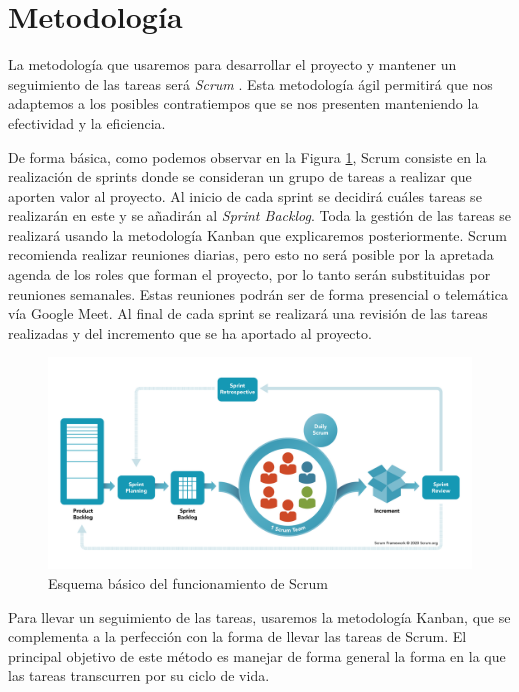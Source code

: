 \section{Metodología}
La metodología que usaremos para desarrollar el proyecto y mantener un seguimiento de las tareas será \textit{Scrum} \cite {scrum}. Esta metodología ágil permitirá que nos adaptemos a los posibles contratiempos que se nos presenten manteniendo la efectividad y la eficiencia. 

De forma básica, como podemos observar en la Figura \ref {fig:scrum_esquema}, Scrum consiste en la realización de sprints donde se consideran un grupo de tareas a realizar que aporten valor al proyecto. Al inicio de cada sprint se decidirá cuáles tareas se realizarán en este y se añadirán al \emph{Sprint Backlog}. Toda la gestión de las tareas se realizará usando la metodología Kanban que explicaremos posteriormente. Scrum recomienda realizar reuniones diarias, pero esto no será posible por la apretada agenda de los roles que forman el proyecto, por lo tanto serán substituidas por reuniones semanales. Estas reuniones podrán ser de forma presencial o telemática vía Google Meet. Al final de cada sprint se realizará una revisión de las tareas realizadas y del incremento que se ha aportado al proyecto.
\begin{figure}[h]
    \centering
    \includegraphics[width=1\textwidth]{img/scrum.png}
    \caption{Esquema básico del funcionamiento de Scrum \cite {scrum}}
    \label{fig:scrum_esquema}
\end{figure}

Para llevar un seguimiento de las tareas, usaremos la metodología Kanban, que se complementa a la perfección con la forma de llevar las tareas de Scrum. El principal objetivo de este método es manejar de forma general la forma en la que las tareas transcurren por su ciclo de vida. 

